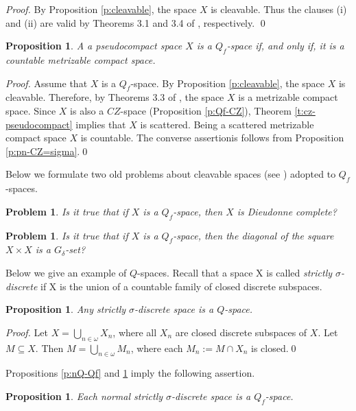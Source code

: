 \documentclass[preprint,11pt]{elsarticle}
\newtheorem{proposition}[theorem]{Proposition}
\newtheorem{problem}[theorem]{Problem}
\numberwithin{equation}{section}
\numberwithin{theorem}{section}
\newcommand{\w}{\omega}
\def\om{\omega}
\begin{document}
\begin{proof}
By Proposition \ref{p:cleavable}, the space $X$ is cleavable. Thus the  clauses (i) and (ii) are valid by Theorems 3.1  and 3.4 of \cite{Arh1993}, respectively. \qed
\end{proof}


\begin{proposition}\label{p:B1-pc}
A a pseudocompact space $X$ is a $Q_f$-space if, and only if, it is a countable metrizable compact space.
\end{proposition}

\begin{proof}
Assume that $X$ is a $Q_f$-space. By Proposition \ref{p:cleavable}, the space $X$ is cleavable. Therefore, by Theorems 3.3 of \cite{Arh1993}, the space $X$ is a metrizable compact space.
 Since $X$ is also a $CZ$-space (Proposition \ref{p:Qf-CZ}), Theorem \ref{t:cz-pseudocompact} implies that $X$ is scattered. Being a scattered metrizable compact space $X$ is countable. The converse assertionis follows from Proposition \ref{p:pn-CZ=sigma}.\qed
\end{proof}


Below we formulate two old problems about cleavable spaces (see \cite{Arh1993,ArhSha1988}) adopted to $Q_f$-spaces.

\begin{problem}
Is it true that if $X$ is a $Q_f$-space, then $X$ is Dieudonne complete?
\end{problem}

\begin{problem}
Is it true that if $X$  is a $Q_f$-space, then the diagonal of the square $X\times X$ is a $G_\delta$-set?
\end{problem}


Below we give an example of $Q$-spaces. Recall that a space X is called {\em strictly $\sigma$-discrete} if X is the union of a countable family of closed discrete subspaces.

\begin{proposition}\label{p:ssd-Q}
Any strictly $\sigma$-discrete space is a $Q$-space.
\end{proposition}
\begin{proof}
Let $X=\bigcup_{n\in\om} X_n$, where all $X_n$ are closed discrete subspaces of $X$. Let $M\subseteq X$. Then $M=\bigcup_{n\in\w} M_n$, where each $M_n :=M\cap X_n$ is closed.\qed
\end{proof}


Propositions \ref{p:nQ-Qf} and \ref{p:ssd-Q} imply the following assertion.
\begin{proposition}\label{p:ssd-Qf}
Each normal strictly $\sigma$-discrete space is a $Q_f$-space.
\end{proposition}
\end{document}

